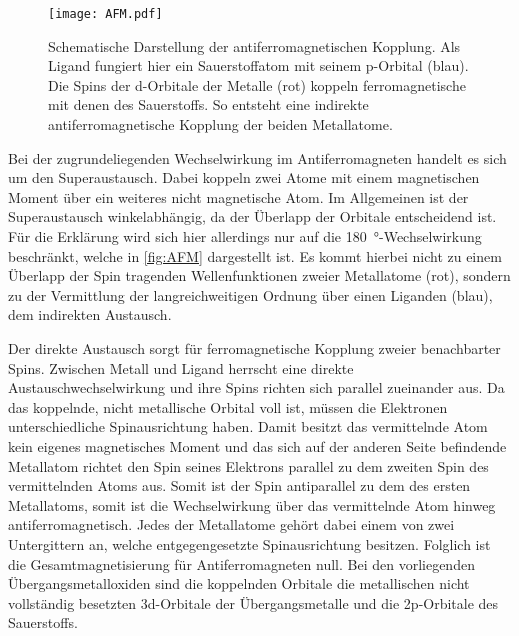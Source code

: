         \begin{figure}
            \centering
            \texttt{[image: AFM.pdf]}
            \caption{Schematische Darstellung der antiferromagnetischen Kopplung.
            Als Ligand fungiert hier ein Sauerstoffatom mit seinem p-Orbital (blau).
            Die Spins der d-Orbitale der Metalle (rot) koppeln ferromagnetische mit denen des Sauerstoffs.
            So entsteht eine indirekte antiferromagnetische Kopplung der beiden Metallatome.}
            \label{fig:AFM}
        \end{figure}
        Bei der zugrundeliegenden Wechselwirkung im Antiferromagneten handelt es sich um den Superaustausch.
        Dabei koppeln zwei Atome mit einem magnetischen Moment über ein weiteres nicht magnetische Atom. 
        Im Allgemeinen ist der Superaustausch winkelabhängig, da der Überlapp der Orbitale entscheidend ist.
        Für die Erklärung wird sich hier allerdings nur auf die \SI{180}{\degree}-Wechselwirkung beschränkt, welche in \autoref{fig:AFM} dargestellt ist.
        Es kommt hierbei nicht zu einem Überlapp der Spin tragenden Wellenfunktionen zweier Metallatome (rot), sondern zu der Vermittlung der langreichweitigen Ordnung über einen Liganden (blau), dem indirekten Austausch.
        
        Der direkte Austausch sorgt für ferromagnetische Kopplung zweier benachbarter Spins.
        Zwischen Metall und Ligand herrscht eine direkte Austauschwechselwirkung und ihre Spins richten sich parallel zueinander aus.
        Da das koppelnde, nicht metallische Orbital voll ist, müssen die Elektronen unterschiedliche Spinausrichtung haben.
        Damit besitzt das vermittelnde Atom kein eigenes magnetisches Moment und das sich auf der anderen Seite befindende Metallatom richtet den Spin seines Elektrons parallel zu dem zweiten Spin des vermittelnden Atoms aus.
        Somit ist der Spin antiparallel zu dem des ersten Metallatoms, somit ist die Wechselwirkung über das vermittelnde Atom hinweg antiferromagnetisch. 
        Jedes der Metallatome gehört dabei einem von zwei Untergittern an, welche entgegengesetzte Spinausrichtung besitzen.
        Folglich ist die Gesamtmagnetisierung für Antiferromagneten null.
        Bei den vorliegenden Übergangsmetalloxiden sind die koppelnden Orbitale die metallischen nicht vollständig besetzten 3d-Orbitale der Übergangsmetalle und die 2p-Orbitale des Sauerstoffs.
        
